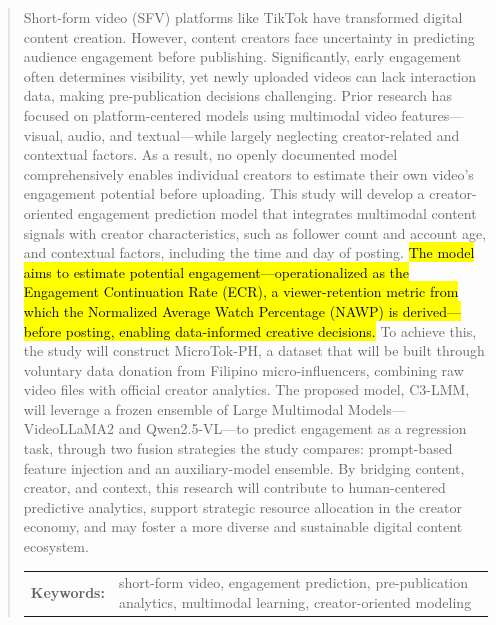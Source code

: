 \begin{abstract}
Short-form video (SFV) platforms like TikTok have transformed digital content creation. However, content creators face uncertainty in predicting audience engagement before publishing. Significantly, early engagement often determines visibility, yet newly uploaded videos can lack interaction data, making pre-publication decisions challenging. Prior research has focused on platform-centered models using multimodal video features—visual, audio, and textual—while largely neglecting creator-related and contextual factors. As a result, no openly documented model comprehensively enables individual creators to estimate their own video's engagement potential before uploading. This study will develop a creator-oriented engagement prediction model that integrates multimodal content signals with creator characteristics, such as follower count and account age, and contextual factors, including the time and day of posting. \hl{The model aims to estimate potential engagement—operationalized as the Engagement Continuation Rate (ECR), a viewer-retention metric from which the Normalized Average Watch Percentage (NAWP) is derived—before posting, enabling data-informed creative decisions.} To achieve this, the study will construct MicroTok-PH, a dataset that will be built through voluntary data donation from Filipino micro-influencers, combining raw video files with official creator analytics. The proposed model, C3-LMM, will leverage a frozen ensemble of Large Multimodal Models—VideoLLaMA2 and Qwen2.5-VL—to predict engagement as a regression task, through two fusion strategies the study compares: prompt-based feature injection and an auxiliary-model ensemble. By bridging content, creator, and context, this research will contribute to human-centered predictive analytics, support strategic resource allocation in the creator economy, and may foster a more diverse and sustainable digital content ecosystem.

%
%


\begin{flushleft}
\begin{tabular}{lp{4.25in}}
\hspace{-0.5em}\textbf{Keywords:}\hspace{0.25em} & short-form video, engagement prediction, pre-publication analytics, multimodal learning, creator-oriented modeling
\end{tabular}
\end{flushleft}
\end{abstract}